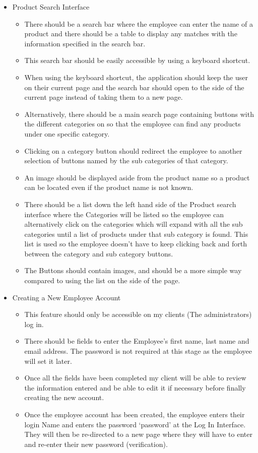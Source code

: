 \begin{itemize}
	\item Product Search Interface
	\begin{itemize}
		\item There should be a search bar where the employee can enter the name of a product and there should be a table to display any matches with the information specified in the search bar.
		\item This search bar should be easily accessible by using a keyboard shortcut.
		\item When using the keyboard shortcut, the application should keep the user on their current page and the search bar should open to the side of the current page instead of taking them to a new page.
		\item Alternatively, there should be a main search page containing buttons with the different categories on so that the employee can find any products under one specific category.
		\item Clicking on a category button should redirect the employee to another selection of buttons named by the sub categories of that category.
		\item An image should be displayed aside from the product name so a product can be located even if the product name is not known.
		\item There should be a list down the left hand side of the Product search interface where the Categories will be listed so the employee can alternatively click on the categories which will expand with all the sub categories until a list of products under that sub category is found. This list is used so the employee doesn't have to keep clicking back and forth between the category and sub category buttons.
		\item The Buttons should contain images, and should be a more simple way compared to using the list on the side of the page.
	\end{itemize}

	\item Creating a New Employee Account
	\begin{itemize}
		\item This feature should only be accessible on my clients (The administrators) log in.
		\item There should be fields to enter the Employee's first name, last name and email address. The password is not required at this stage as the employee will set it later.
		\item Once all the fields have been completed my client will be able to review the information entered and be able to edit it if necessary before finally creating the new account.
		\item Once the employee account has been created, the employee enters their login Name and enters the password ‘password’ at the Log In Interface. They will then be re-directed to a new page where they will have to enter and re-enter their new password (verification). 
	\end{itemize}


\end{itemize}
